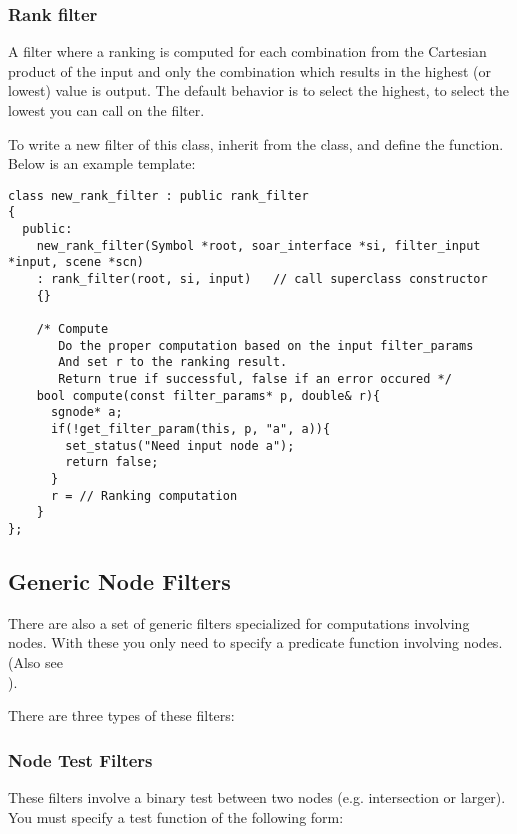 \subsubsection{Rank filter}

A filter where a ranking is computed for each combination from the Cartesian
product of the input and only the combination which results in the highest
(or lowest) value is output. The default behavior is to select the highest,
to select the lowest you can call  on the filter.

To write a new filter of this class, inherit from the  class,
and define the  function. Below is an example template:

{\footnotesize
\begin{verbatim}
class new_rank_filter : public rank_filter
{
  public:
    new_rank_filter(Symbol *root, soar_interface *si, filter_input *input, scene *scn)
    : rank_filter(root, si, input)   // call superclass constructor
    {}

    /* Compute
       Do the proper computation based on the input filter_params
       And set r to the ranking result.
       Return true if successful, false if an error occured */
    bool compute(const filter_params* p, double& r){
      sgnode* a;
      if(!get_filter_param(this, p, "a", a)){
        set_status("Need input node a");
        return false;
      }
      r = // Ranking computation
    }
};
\end{verbatim}
}


\subsection{Generic Node Filters}

There are also a set of generic filters specialized for computations involving nodes.
With these you only need to specify a predicate function involving nodes. (Also see \\
).

There are three types of these filters:

\subsubsection{Node Test Filters}

These filters involve a binary test between two nodes (e.g. intersection or larger).
You must specify a test function of the following form:

